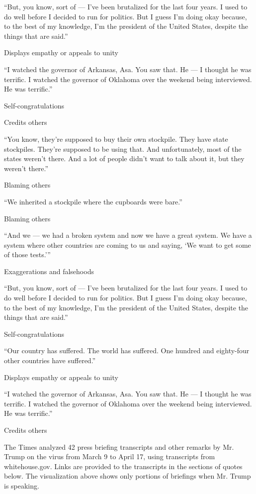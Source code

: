 ``But, you know, sort of --- I've been brutalized for the last four
years. I used to do well before I decided to run for politics. But I
guess I'm doing okay because, to the best of my knowledge, I'm the
president of the United States, despite the things that are said.''

Displays empathy or appeals to unity

``I watched the governor of Arkansas, Asa. You saw that. He --- I
thought he was terrific. I watched the governor of Oklahoma over the
weekend being interviewed. He was terrific.''

Self-congratulations

Credits others

``You know, they're supposed to buy their own stockpile. They have state
stockpiles. They're supposed to be using that. And unfortunately, most
of the states weren't there. And a lot of people didn't want to talk
about it, but they weren't there.''

Blaming others

``We inherited a stockpile where the cupboards were bare.''

Blaming others

``And we --- we had a broken system and now we have a great system. We
have a system where other countries are coming to us and saying, `We
want to get some of those tests.'''

Exaggerations and falsehoods

``But, you know, sort of --- I've been brutalized for the last four
years. I used to do well before I decided to run for politics. But I
guess I'm doing okay because, to the best of my knowledge, I'm the
president of the United States, despite the things that are said.''

Self-congratulations

``Our country has suffered. The world has suffered. One hundred and
eighty-four other countries have suffered.''

Displays empathy or appeals to unity

``I watched the governor of Arkansas, Asa. You saw that. He --- I
thought he was terrific. I watched the governor of Oklahoma over the
weekend being interviewed. He was terrific.''

Credits others

The Times analyzed 42 press briefing transcripts and other remarks by
Mr. Trump on the virus from March 9 to April 17, using transcripts from
whitehouse.gov. Links are provided to the transcripts in the sections of
quotes below. The visualization above shows only portions of briefings
when Mr. Trump is speaking.

